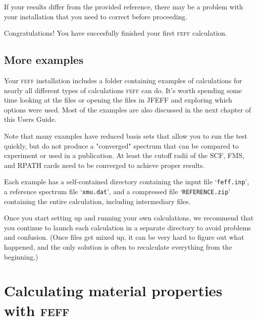 \documentclass[11pt,oneside]{report} %
\newcommand{\program}[1]{\textsc{#1}}
\newcommand{\feff}{\program{feff}}
\newcommand{\file}[1]{`\texttt{#1}'}
\begin{document}
If your results differ from the provided reference, there may be a problem with your installation that you need to correct before proceeding.


Congratulations!  You have succesfully finished your first {\feff} calculation.




\section{More examples}
Your {\feff} installation includes a folder containing examples of calculations for nearly all different types of calculations {\feff} can do.  It's worth spending some time looking at the files or opening the files in JFEFF and exploring which options were used.  Most of the examples are also discussed in the next chapter of this Users Guide.

Note that many examples have reduced basis sets that allow you to run the test quickly, but do not produce a "converged" spectrum that can be compared to experiment or used in a publication.  At least the cutoff radii of the SCF, FMS, and RPATH cards need to be converged to achieve proper results.

Each example has a self-contained directory containing the input file \file{feff.inp}, a reference spectrum file \file{xmu.dat}, and a compressed file \file{REFERENCE.zip} containing the entire calculation, including intermediary files.

Once you start setting up and running your own calculations, we recommend that you continue to launch each calculation in a separate directory to avoid problems and confusion.  (Once files get mixed up, it can be very hard to figure out what happened, and the only solution is often to recalculate everything from the beginning.)






\chapter{Calculating material properties with {\feff}}
\label{sec:Calc-Strat-Exampl}

\end{document}
